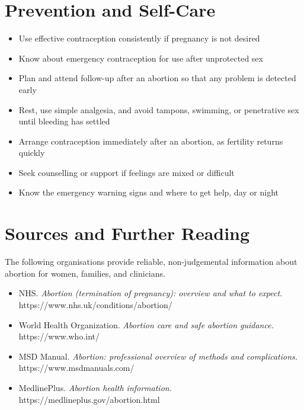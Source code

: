 \section*{Prevention and Self-Care}
\begin{itemize}
    \item Use effective contraception consistently if pregnancy is not desired
    \item Know about emergency contraception for use after unprotected sex
    \item Plan and attend follow-up after an abortion so that any problem is detected early
    \item Rest, use simple analgesia, and avoid tampons, swimming, or penetrative sex until bleeding has settled
    \item Arrange contraception immediately after an abortion, as fertility returns quickly
    \item Seek counselling or support if feelings are mixed or difficult
    \item Know the emergency warning signs and where to get help, day or night
\end{itemize}

\section*{Sources and Further Reading}
The following organisations provide reliable, non-judgemental information about abortion for women, families, and clinicians.

\begin{itemize}
    \item NHS. \textit{Abortion (termination of pregnancy): overview and what to expect.} https://www.nhs.uk/conditions/abortion/
    \item World Health Organization. \textit{Abortion care and safe abortion guidance.} https://www.who.int/
    \item MSD Manual. \textit{Abortion: professional overview of methods and complications.} https://www.msdmanuals.com/
    \item MedlinePlus. \textit{Abortion health information.} https://medlineplus.gov/abortion.html
\end{itemize}
